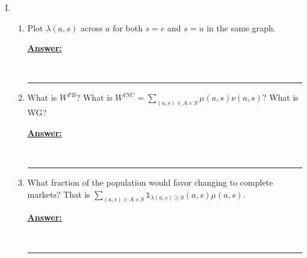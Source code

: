 \documentclass{article} %
\newcommand{\ifn}{\mathds{1}}
\theoremstyle{definition}
\newenvironment{solution}[1][Answer]{\begin{singlespace}\underline{\textbf{#1:}}\quad }{\ \rule{0.3em}{0.3em}\end{singlespace}} %
\begin{document}
\begin{enumerate}[I.]
		\begin{enumerate}[4.]
			\item After finding fixed points of the $ T $ and $ T^* $ operators, answer the following questions:
			\begin{enumerate}[a.]
				\item  Plot the policy function $ g(a, s) $ over $ a $ for each $ s $ to verify that there exist $ \hat{a} $ where
				$ g(\hat{a}, s) < \hat{a} $ as in Figure 1 of Huggett. (Recall this condition establishes an upper bound on
				the set $ A $ necessary to obtain an invariant distribution).
				\begin{solution}
					
				\end{solution}
			
				\item What is the equilibrium bond price? Plot the cross-sectional distribution of wealth for those employed and those unemployed on the same graph.
				\begin{solution}
					
				\end{solution}
			
				\item Plot a Lorenz curve. What is the gini index for your economy? Compare them to the data. For this problem set, define wealth as current earnings (think of this as direct deposited
				into your bank, so it is your cash holdings) plus net assets. Since market clearing implies aggregate assets equal zero, this wealth definition avoids division by zero in computing the Gini and Lorenz curve.
				\begin{solution}
					
				\end{solution}
			\end{enumerate}
		\end{enumerate}
		
		\item 
		\begin{enumerate}
			\item Plot $ \lambda(a,s) $ across $ a $ for both $ s = e $ and $ s = u $ in the same graph. 
			\begin{solution}
				
			\end{solution}
			\item What is $ W^{FB} $? What is $ W^{INC}  = \sum_{(a,s) \in A \times S} \mu(a,s) \nu(a,s) $? What is WG?
			\begin{solution}
				
			\end{solution}
			\item What fraction of the population would favor changing to complete markets? That is $   \sum_{(a,s) \in A \times S}   \ifn_{\lambda(a,s) \geq 0}  (a,s) \mu(a,s) $.
			\begin{solution}
				
			\end{solution}
		\end{enumerate}
	\end{enumerate}
\end{document}
